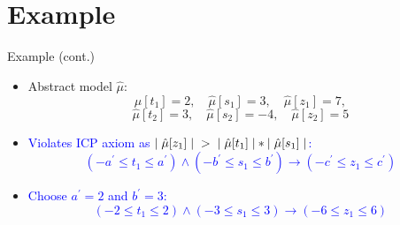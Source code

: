 \documentclass[]{beamer}
\begin{document}
\section{Example}
\begin{frame}{Example (cont.)}
    \begin{itemize}
        \item \textcolor{red!80!black}{Abstract model $\hat{\mu}$: $$\hat{\mu}[t_{1}] = 2, \quad \hat{\mu}[s_{1}] = 3, \quad \hat{\mu}[z_{1}] = 7,$$ $$\hat{\mu}[t_{2}] = 3, \quad \hat{\mu}[s_{2}] = -4, \quad \hat{\mu}[z_{2}] = 5$$}
        \item \textcolor<1>{blue}{Violates ICP axiom as $|\hspace{1mm}\hat{\mu}[z_{1}]\hspace{1mm}| \hspace{1mm} > \hspace{1mm} |\hspace{1mm}\hat{\mu}[t_{1}]\hspace{1mm}| \ast |\hspace{1mm}\hat{\mu}[s_{1}]\hspace{1mm}|$:
         $$(-a^\prime \leq t_{1} \leq a^\prime) \wedge (-b^\prime \leq s_{1} \leq b^\prime) \rightarrow (-c^\prime \leq z_{1} \leq c^\prime)$$}
         \item \textcolor<2>{blue}{Choose $a^\prime = 2$ and $b^\prime =3$:
         $$(-2 \leq t_{1} \leq 2) \wedge (-3 \leq s_{1} \leq 3) \rightarrow (-6 \leq z_{1} \leq 6)$$}
    \end{itemize}
\end{frame}
\end{document}
